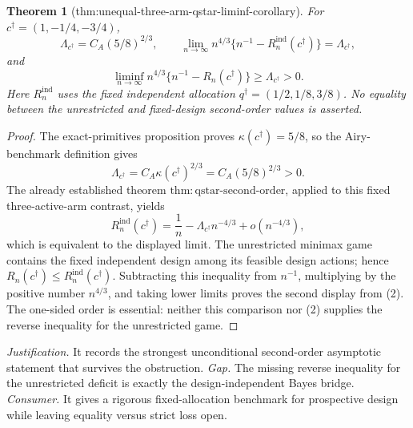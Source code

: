 \documentclass{article}
\newtheorem{theorem}{Theorem}
\begin{document}
{\begin{theorem}[thm:unequal-three-arm-qstar-liminf-corollary]\label{thm:unequal-three-arm-qstar-liminf-corollary}
For \(c^\dagger=(1,-1/4,-3/4)\),
\[
\Lambda_{c^\dagger}=C_A(5/8)^{2/3},
\qquad
\lim_{n\to\infty}n^{4/3}\{n^{-1}-R_n^{\mathrm{ind}}(c^\dagger)\}
=\Lambda_{c^\dagger},
\]
and
\[
\liminf_{n\to\infty}n^{4/3}\{n^{-1}-R_n(c^\dagger)\}
\ge\Lambda_{c^\dagger}>0.
\]
Here \(R_n^{\mathrm{ind}}\) uses the fixed independent allocation
\(q^\dagger=(1/2,1/8,3/8)\).  No equality between the unrestricted and fixed-design second-order values is asserted.
\end{theorem}
\begin{proof}
The exact-primitives proposition proves
\(\kappa(c^\dagger)=5/8\), so the Airy-benchmark definition gives
\[
\Lambda_{c^\dagger}=C_A\kappa(c^\dagger)^{2/3}
=C_A(5/8)^{2/3}>0. \tag{1}
\]
The already established theorem \(\mathrm{thm:qstar\text{-}second\text{-}order}\), applied to this fixed three-active-arm contrast, yields
\[
R_n^{\mathrm{ind}}(c^\dagger)
=\frac1n-\Lambda_{c^\dagger}n^{-4/3}+o(n^{-4/3}), \tag{2}
\]
which is equivalent to the displayed limit.  The unrestricted minimax game contains the fixed independent design among its feasible design actions; hence
\(R_n(c^\dagger)\le R_n^{\mathrm{ind}}(c^\dagger)\).  Subtracting this inequality from \(n^{-1}\), multiplying by the positive number \(n^{4/3}\), and taking lower limits proves the second display from (2).  The one-sided order is essential: neither this comparison nor (2) supplies the reverse inequality for the unrestricted game.
\end{proof}
\par\smallskip\noindent \textit{Justification.} It records the strongest unconditional second-order asymptotic statement that survives the obstruction. \textit{Gap.} The missing reverse inequality for the unrestricted deficit is exactly the design-independent Bayes bridge. \textit{Consumer.} It gives a rigorous fixed-allocation benchmark for prospective design while leaving equality versus strict loss open.

}
\end{document}
